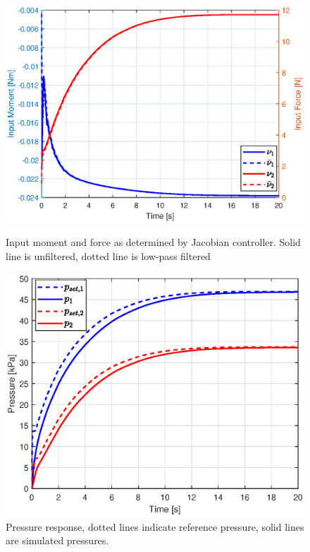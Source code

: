 \begin{figure}[H]
\begin{minipage}{0.5\textwidth}
        \label{fig5:controlinputsim}
    \end{minipage}
\begin{minipage}{0.5\textwidth}
        \centering
        \includegraphics[width=\textwidth]{Figures/Chapter5/forcemomentsim.eps} 
        \caption{Input moment and force as determined by Jacobian controller. Solid line is unfiltered, dotted line is low-pass filtered}
        \label{fig5:inputsim}

    \end{minipage}\hfill
    \begin{minipage}{0.5\textwidth}
        \centering
        \includegraphics[width=\textwidth]{Figures/Chapter5/pressuresim.eps}
        \caption{Pressure response, dotted lines indicate reference pressure, solid lines are simulated pressures.}
        \label{fig5:pressuresim}
    \end{minipage}
\end{figure}




